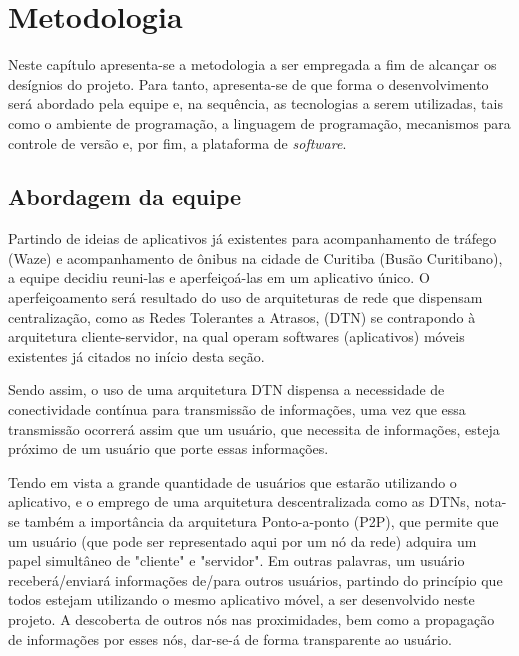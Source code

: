 \chapter{Metodologia}\label{cap:metodologia}

Neste capítulo apresenta-se a metodologia a ser empregada a fim de alcançar os desígnios do projeto. Para tanto, apresenta-se de que forma o desenvolvimento será abordado pela equipe e, na sequência, as tecnologias a serem utilizadas, tais como o ambiente de programação, a linguagem de programação, mecanismos para controle de versão e, por fim, a plataforma de \textit{software}. 

\section{Abordagem da equipe}\label{s:fundamentos}

Partindo de ideias de aplicativos já existentes para acompanhamento de tráfego (Waze) e acompanhamento de ônibus na cidade de Curitiba (Busão Curitibano), a equipe decidiu reuni-las e aperfeiçoá-las em um aplicativo único. O aperfeiçoamento será resultado do uso de arquiteturas de rede que dispensam centralização, como as Redes Tolerantes a Atrasos, (DTN) se contrapondo à arquitetura cliente-servidor, na qual operam softwares (aplicativos) móveis existentes já citados no início desta seção. 

Sendo assim, o uso de uma arquitetura DTN dispensa a necessidade de conectividade contínua para transmissão de informações, uma vez que essa transmissão ocorrerá assim que um usuário, que necessita de informações, esteja próximo de um usuário que porte essas informações. 

Tendo em vista a grande quantidade de usuários que estarão utilizando o aplicativo, e o emprego de uma arquitetura descentralizada como as DTNs, nota-se também a importância da arquitetura Ponto-a-ponto (P2P), que permite que um usuário (que pode ser representado aqui por um nó da rede) adquira um papel simultâneo de "cliente" e "servidor". Em outras palavras, um usuário receberá/enviará informações de/para outros usuários, partindo do princípio que todos estejam utilizando o mesmo aplicativo móvel, a ser desenvolvido neste projeto. A descoberta de outros nós nas proximidades, bem como a propagação de informações por esses nós, dar-se-á de forma transparente ao usuário.


